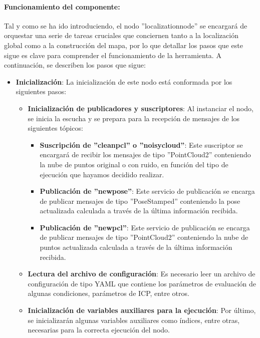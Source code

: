 \documentclass[12pt, a4paper, twoside]{article}
\begin{document}
\paragraph{Funcionamiento del componente:}
Tal y como se ha ido introduciendo, el nodo ''localization\textunderscore node'' se encargará de orquestar una serie de tareas cruciales que conciernen tanto 
a la localización global como a la construcción del mapa, por lo que detallar los pasos que este sigue es clave para comprender el funcionamiento de la herramienta. 
A continuación, se describen los pasos que sigue:
\begin{itemize}
  \item \textbf{Inicialización}: La inicialización de este nodo está conformada por los siguientes pasos:
  \begin{itemize}
    \item \textbf{Inicialización de publicadores y suscriptores}: Al instanciar el nodo, se inicia la escucha y se prepara para la recepción de mensajes de los 
    siguientes tópicos:
    \begin{itemize}
      \item \textbf{Suscripción de ''clean\textunderscore pcl'' o ''noisy\textunderscore cloud''}: Este suscriptor se encargará de recibir los mensajes de tipo 
      ''PointCloud2'' conteniendo la nube de puntos original o con ruido, en función del tipo de ejecución que hayamos decidido realizar.
      \item \textbf{Publicación de ''new\textunderscore pose''}: Este servicio de publicación se encarga de publicar mensajes de tipo ''PoseStamped'' conteniendo 
      la pose actualizada calculada a través de la última información recibida.
      \item \textbf{Publicación de ''new\textunderscore pcl''}: Este servicio de publicación se encarga de publicar mensajes de tipo ''PointCloud2'' conteniendo 
      la nube de puntos actualizada calculada a través de la última información recibida.
    \end{itemize}
    \item \textbf{Lectura del archivo de configuración}: Es necesario leer un archivo de configuración de tipo YAML\cite{yaml} que contiene los parámetros de evaluación de 
    algunas condiciones, parámetros de ICP, entre otros.
    \item \textbf{Inicialización de variables auxiliares para la ejecución}: Por último, se inicializarán algunas variables auxiliares como índices, entre otras, necesarias 
    para la correcta ejecución del nodo.

\end{itemize}
\end{itemize}
\end{document}
